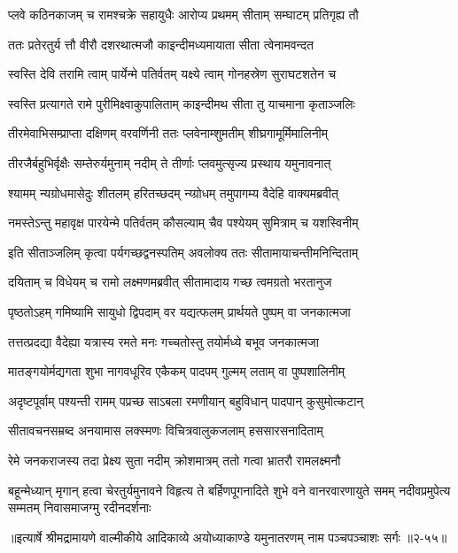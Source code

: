 \twolineshloka
{प्लवे कठिनकाजम् च रामश्चक्रे सहायुधैः}
{आरोप्य प्रथमम् सीताम् सम्घाटम् प्रतिगृह्य तौ} %

\twolineshloka
{ततः प्रतेरतुर्य त्तौ वीरौ दशरथात्मजौ}
{काइन्दीमध्यमायाता सीता त्वेनामवन्दत} %

\twolineshloka
{स्वस्ति देवि तरामि त्वाम् पार्येन्मे पतिर्वतम्}
{यक्ष्ये त्वाम् गोनहस्रेण सुराघटशतेन च} %

\twolineshloka
{स्वस्ति प्रत्यागते रामे पुरीमिक्ष्वाकुपालिताम्}
{काइन्दीमथ सीता तु याचमाना कृताञ्जलिः} %

\twolineshloka
{तीरमेवाभिसम्प्राप्ता दक्षिणम् वरवर्णिनी}
{ततः प्लवेनाम्शुमतीम् शीघ्रगामूर्मिमालिनीम्} %

\twolineshloka
{तीरजैर्बहुभिर्वृक्षैः सम्तेरुर्यमुनाम् नदीम्}
{ते तीर्णाः प्लवमुत्सृज्य प्रस्थाय यमुनावनात्} %

\twolineshloka
{श्यामम् न्यग्रोधमासेदुः शीतलम् हरितच्छदम्}
{न्य्ग्रोधम् तमुपागम्य वैदेहि वाक्यमब्रवीत्} %

\twolineshloka
{नमस्तेऽन्तु महावृक्ष पारयेन्मे पतिर्वतम्}
{कौसल्याम् चैव पश्येयम् सुमित्राम् च यशस्विनीम्} %

\twolineshloka
{इति सीताञ्जलिम् कृत्वा पर्यगच्छद्वनस्पतिम्}
{अवलोक्य ततः सीतामायाचन्तीमनिन्दिताम्} %

\twolineshloka
{दयिताम् च विधेयम् च रामो लक्ष्मणमब्रवीत्}
{सीतामादाय गच्छ त्वमग्रतो भरतानुज} %

\twolineshloka
{पृष्ठतोऽहम् गमिष्यामि सायुधो द्विपदाम् वर}
{यद्यत्फलम् प्रार्थयते पुष्पम् वा जनकात्मजा} %

\twolineshloka
{तत्तत्प्रदद्या वैदेह्या यत्रास्य रमते मनः}
{गच्चतोस्तु तयोर्मध्ये बभूव जनकात्मजा} %

\twolineshloka
{मातङ्गयोर्मद्यगता शुभा नागवधूरिव}
{एकैकम् पादपम् गुल्मम् लताम् वा पुष्पशालिनीम्} %

\twolineshloka
{अदृष्टपूर्वाम् पश्यन्ती रामम् पप्रच्छ साऽबला}
{रमणीयान् बहुविधान् पादपान् कुसुमोत्कटान्} %

\twolineshloka
{सीतावचनसम्रब्द अनयामास लक्स्मणः}
{विचित्रवालुकजलाम् हससारसनादिताम्} %

\twolineshloka
{रेमे जनकराजस्य तदा प्रेक्ष्य सुता नदीम्}
{क्रोशमात्रम् ततो गत्वा भ्रातरौ रामलक्ष्मनौ} %

\twolineshloka
{बहून्मेध्यान् मृगान् हत्वा चेरतुर्यमुनावने}
{विहृत्य ते बर्हिणपूगनादिते}
{शुभे वने वानरवारणायुते}
{समम् नदीवप्रमुपेत्य सम्मतम्}
{निवासमाजग्मु रदीनदर्शनाः} %


॥इत्यार्षे श्रीमद्रामायणे वाल्मीकीये आदिकाव्ये अयोध्याकाण्डे यमुनातरणम् नाम पञ्चपञ्चाशः सर्गः ॥२-५५॥
